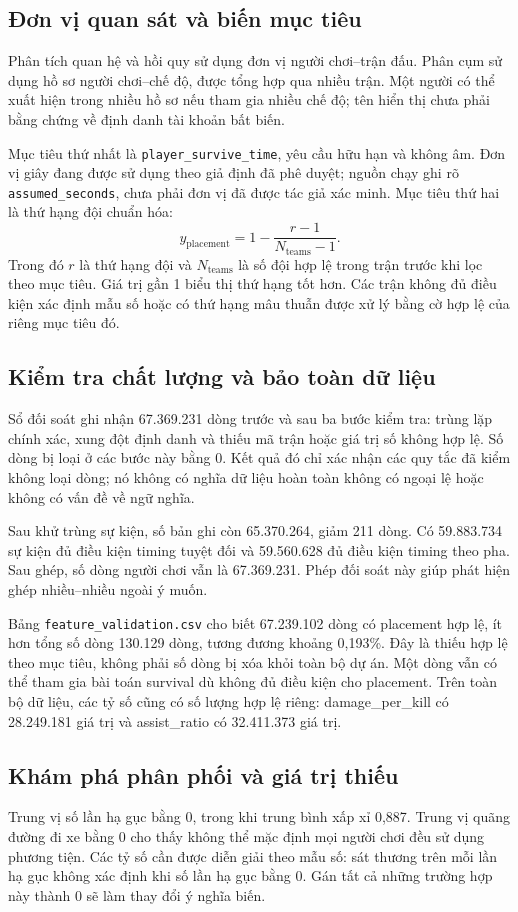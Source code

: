 \documentclass[12pt,a4paper]{article}
\begin{document}
\subsection{Đơn vị quan sát và biến mục tiêu}
Phân tích quan hệ và hồi quy sử dụng đơn vị người chơi--trận đấu. Phân cụm sử dụng hồ sơ người chơi--chế độ, được tổng hợp qua nhiều trận. Một người có thể xuất hiện trong nhiều hồ sơ nếu tham gia nhiều chế độ; tên hiển thị chưa phải bằng chứng về định danh tài khoản bất biến.

Mục tiêu thứ nhất là \texttt{player\_survive\_time}, yêu cầu hữu hạn và không âm. Đơn vị giây đang được sử dụng theo giả định đã phê duyệt; nguồn chạy ghi rõ \texttt{assumed\_seconds}, chưa phải đơn vị đã được tác giả xác minh. Mục tiêu thứ hai là thứ hạng đội chuẩn hóa:
\[
y_{\mathrm{placement}}=1-\frac{r-1}{N_{\mathrm{teams}}-1}.
\]
Trong đó $r$ là thứ hạng đội và $N_{\mathrm{teams}}$ là số đội hợp lệ trong trận trước khi lọc theo mục tiêu. Giá trị gần 1 biểu thị thứ hạng tốt hơn. Các trận không đủ điều kiện xác định mẫu số hoặc có thứ hạng mâu thuẫn được xử lý bằng cờ hợp lệ của riêng mục tiêu đó.
\subsection{Kiểm tra chất lượng và bảo toàn dữ liệu}
Sổ đối soát ghi nhận 67.369.231 dòng trước và sau ba bước kiểm tra: trùng lặp chính xác, xung đột định danh và thiếu mã trận hoặc giá trị số không hợp lệ. Số dòng bị loại ở các bước này bằng 0. Kết quả đó chỉ xác nhận các quy tắc đã kiểm không loại dòng; nó không có nghĩa dữ liệu hoàn toàn không có ngoại lệ hoặc không có vấn đề về ngữ nghĩa.

Sau khử trùng sự kiện, số bản ghi còn 65.370.264, giảm 211 dòng. Có 59.883.734 sự kiện đủ điều kiện timing tuyệt đối và 59.560.628 đủ điều kiện timing theo pha. Sau ghép, số dòng người chơi vẫn là 67.369.231. Phép đối soát này giúp phát hiện ghép nhiều--nhiều ngoài ý muốn.

Bảng \texttt{feature\_validation.csv} cho biết 67.239.102 dòng có placement hợp lệ, ít hơn tổng số dòng 130.129 dòng, tương đương khoảng 0,193\%. Đây là thiếu hợp lệ theo mục tiêu, không phải số dòng bị xóa khỏi toàn bộ dự án. Một dòng vẫn có thể tham gia bài toán survival dù không đủ điều kiện cho placement. Trên toàn bộ dữ liệu, các tỷ số cũng có số lượng hợp lệ riêng: damage\_per\_kill có 28.249.181 giá trị và assist\_ratio có 32.411.373 giá trị.
\subsection{Khám phá phân phối và giá trị thiếu}

Trung vị số lần hạ gục bằng 0, trong khi trung bình xấp xỉ 0,887. Trung vị quãng đường đi xe bằng 0 cho thấy không thể mặc định mọi người chơi đều sử dụng phương tiện. Các tỷ số cần được diễn giải theo mẫu số: sát thương trên mỗi lần hạ gục không xác định khi số lần hạ gục bằng 0. Gán tất cả những trường hợp này thành 0 sẽ làm thay đổi ý nghĩa biến.
\end{document}
